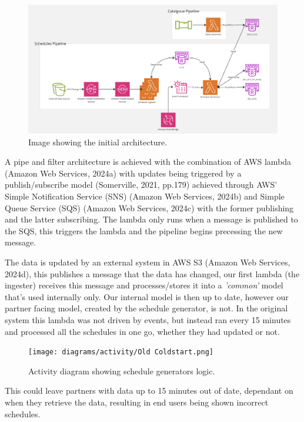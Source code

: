   \begin{figure}[H]
    \centering
    \includegraphics[width=12cm]{assets/architectures/starting.png}
    \caption{Image showing the initial architecture.}
    \label{fig:initialArchitecture}
  \end{figure}

  A pipe and filter architecture is achieved with the combination of AWS lambda (Amazon Web Services, 2024a) with updates being triggered by a publish/subscribe 
  model (Somerville, 2021, pp.179) achieved through AWS' Simple Notification Service (SNS) (Amazon Web Services, 2024b) and Simple Queue Service (SQS) 
  (Amazon Web Services, 2024c) with the former publishing and the latter subscribing. The lambda only runs when a message is published to the SQS, this triggers 
  the lambda and the pipeline begins precessing the new message.

  The data is updated by an external system in AWS S3 (Amazon Web Services, 2024d), this publishes a message that the data has changed, our first lambda 
  (the ingester) receives this message and processes/stores it into a \textit{'common'} model that's used internally only. Our internal model is then up to date,
  however our partner facing model, created by the schedule generator, is not. In the original system this lambda was not driven by events, but instead ran every
  15 minutes and processed all the schedules in one go, whether they had updated or not. 
  
  \begin{figure}[H]
    \centering
    \texttt{[image: diagrams/activity/Old Coldstart.png]}
    \caption{Activity diagram showing schedule generators logic.}
    \label{fig:oldColdstart}
  \end{figure}

  This could leave partners with data up to 15 minutes out of date, dependant on when they retrieve the data, resulting in end users being shown incorrect
  schedules. 

